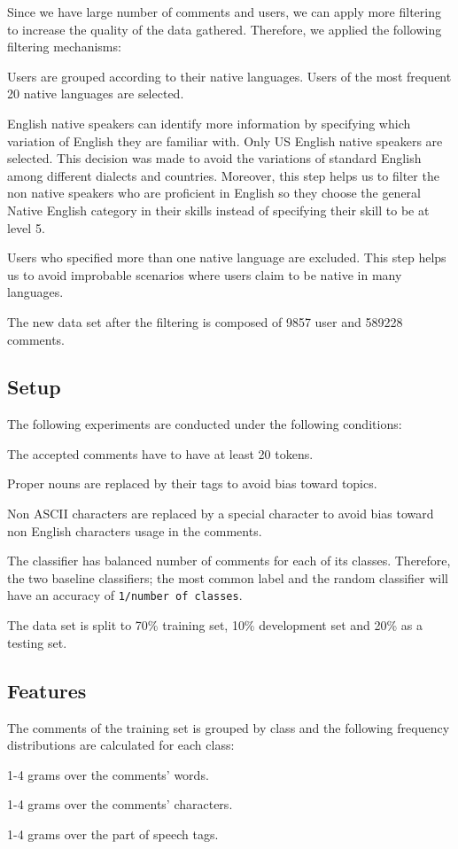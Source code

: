 \documentclass[10pt,a5paper,twoside]{article}
\begin{document}
Since we have large number of comments and users, we can apply more filtering to
increase the quality of the data gathered. Therefore, we applied the following filtering mechanisms:
\begin{compactitem}
\item Users are grouped according to their native languages. Users of the most frequent 20 native languages are selected.
\item English native speakers can identify more information by specifying which
variation of English they are familiar with. Only US English native speakers are
selected. This decision was made to avoid the variations of standard English
among different dialects and countries. Moreover, this step helps us to filter
the non native speakers who are proficient in English so they choose the general
Native English category in their skills instead of specifying their skill to be
at level 5.
\item Users who specified more than one native language are excluded. This step
helps us to avoid improbable scenarios where users claim to be native in many
languages.
\end{compactitem}

The new data set after the filtering is composed of 9857 user and 589228 comments.

\subsection{Setup}
The following experiments are conducted under the following conditions:
\begin{compactitem}
\item The accepted comments have to have at least 20 tokens.
\item Proper nouns are replaced by their tags to avoid bias toward topics.
\item Non ASCII characters are replaced by a special character to avoid bias toward non English characters usage in the comments.
\item The classifier has balanced number of comments for each of its classes. Therefore, the two baseline classifiers; the most common label and the random classifier will have an accuracy of \verb+1/number of classes+.
\item The data set is split to 70\% training set, 10\% development set and 20\%
as a testing set.
\end{compactitem}

\subsection{Features}
The comments of the training set is grouped by class and the following frequency distributions are calculated for each class:
\begin{compactitem}
\item 1-4 grams over the comments' words.
\item 1-4 grams over the comments' characters.
\item 1-4 grams over the part of speech tags.
\end{compactitem}
\end{document}
